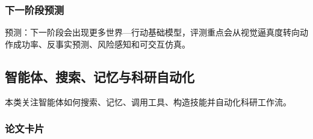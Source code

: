 \subsubsection{下一阶段预测}
预测：下一阶段会出现更多世界—行动基础模型，评测重点会从视觉逼真度转向动作成功率、反事实预测、风险感知和可交互仿真。

\subsection{智能体、搜索、记忆与科研自动化}

本类关注智能体如何搜索、记忆、调用工具、构造技能并自动化科研工作流。

\subsubsection{论文卡片}
